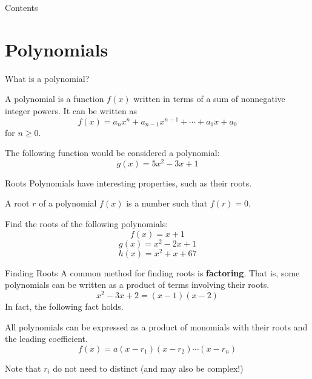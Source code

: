 \documentclass[aspectratio=169,xcolor=dvipsnames]{beamer}
\begin{document}
\begin{frame}[plain]
  \titlepage
\end{frame}

\begin{frame}[plain]{Contents}
  \tableofcontents
\end{frame}

\section{Polynomials}

\begin{frame}{What is a polynomial?}
    \begin{definition}
        A polynomial is a function $f(x)$ written in terms of a sum of nonnegative integer powers. It can be written as
        \[f(x)=a_nx^n+a_{n-1}x^{n-1}+\cdots +a_1x+a_0\]
        for $n\ge0$.
    
    \end{definition}
    
    \vspace{0.5cm}
    
    The following function would be considered a polynomial:
    \[
    g(x)=5x^2-3x+1
    \]
\end{frame}

\begin{frame}{Roots}
    Polynomials have interesting properties, such as their roots.
    
    \begin{definition}
        A root $r$ of a polynomial $f(x)$ is a number such that $f(r)=0$.
    \end{definition}
    
    Find the roots of the following polynomials:
    \[f(x)=x+1\]
    \[g(x)=x^2-2x+1\]
    \[h(x)=x^2+x+67\]
\end{frame}

\begin{frame}{Finding Roots}
    A common method for finding roots is \textbf{factoring}. That is, some polynomials can be written as a product of terms involving their roots.
    \[
    x^2-3x+2=(x-1)(x-2)
    \]
    In fact, the following fact holds.

    \begin{theorem}
        All polynomials can be expressed as a product of monomials with their roots and the leading coefficient.
        \[f(x)=a(x-r_1)(x-r_2)\cdots(x-r_n)\]
    \end{theorem}

    \vspace{0.5cm}

    Note that \(r_i\) do not need to distinct (and may also be complex!)
\end{frame}
\end{document}
